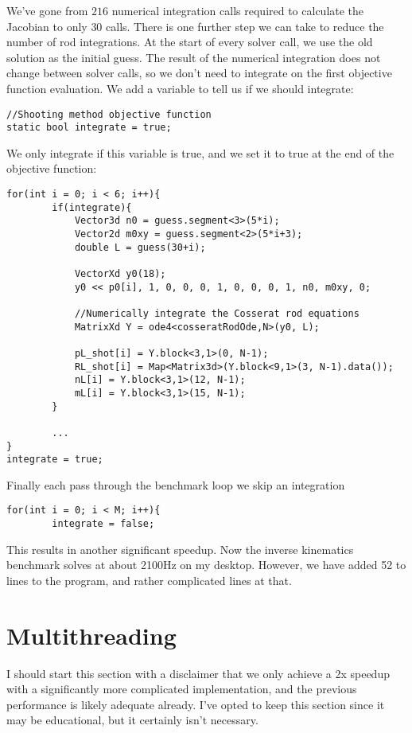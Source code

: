 \documentclass[12pt]{article}
\begin{document}
We've gone from $216$ numerical integration calls required to calculate the Jacobian to only $30$ calls. There is one further step we can take to reduce the number of rod integrations. At the start of every solver call, we use the old solution as the initial guess. The result of the numerical integration does not change between solver calls, so we don't need to integrate on the first objective function evaluation. We add a variable to tell us if we should integrate:
\begin{lstlisting}
//Shooting method objective function
static bool integrate = true;
\end{lstlisting}
We only integrate if this variable is true, and we set it to true at the end of the objective function:
\begin{lstlisting}
for(int i = 0; i < 6; i++){
        if(integrate){
            Vector3d n0 = guess.segment<3>(5*i);
            Vector2d m0xy = guess.segment<2>(5*i+3);
            double L = guess(30+i);

            VectorXd y0(18);
            y0 << p0[i], 1, 0, 0, 0, 1, 0, 0, 0, 1, n0, m0xy, 0;

            //Numerically integrate the Cosserat rod equations
            MatrixXd Y = ode4<cosseratRodOde,N>(y0, L);

            pL_shot[i] = Y.block<3,1>(0, N-1);
            RL_shot[i] = Map<Matrix3d>(Y.block<9,1>(3, N-1).data());
            nL[i] = Y.block<3,1>(12, N-1);
            mL[i] = Y.block<3,1>(15, N-1);
        }
				
        ...
}
integrate = true;
\end{lstlisting}
Finally each pass through the benchmark loop we skip an integration
\begin{lstlisting}
for(int i = 0; i < M; i++){
        integrate = false;
\end{lstlisting}
This results in another significant speedup. Now the inverse kinematics benchmark solves at about 2100Hz on my desktop. However, we have added 52 to lines to the program, and rather complicated lines at that.


\section{Multithreading}

I should start this section with a disclaimer that we only achieve a 2x speedup with a significantly more complicated implementation, and the previous performance is likely adequate already. I've opted to keep this section since it may be educational, but it certainly isn't necessary.
\end{document}

